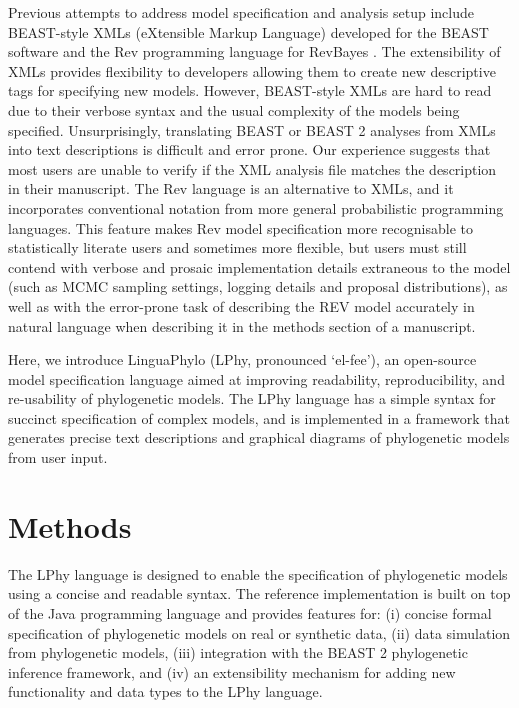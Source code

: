 \documentclass[10pt,letterpaper,table]{article}
\begin{document}
Previous attempts to address model specification and analysis setup include BEAST-style XMLs (eXtensible Markup Language) developed for the BEAST software \cite{beast,beast2} and the Rev programming language for RevBayes \cite{revbayes}. 
The extensibility of XMLs provides flexibility to developers allowing them to create new descriptive tags for specifying new models.
However, BEAST-style XMLs are hard to read due to their verbose syntax and the usual complexity of the models being specified. 
Unsurprisingly, translating BEAST or BEAST 2 analyses from XMLs into text descriptions is difficult and error prone. Our experience suggests that most users are unable to verify if the XML analysis file matches the description in their manuscript.
The Rev language \cite{revbayes} is an alternative to XMLs, and it incorporates conventional notation from more general probabilistic programming languages. 
This feature makes Rev model specification more recognisable to statistically literate users and sometimes more flexible, but users must still contend with verbose and prosaic implementation 
details extraneous to the model
(such as MCMC sampling settings, logging details and proposal distributions), as well as with the error-prone task of describing the REV model accurately in natural language when describing it in the methods section of a manuscript.
 
Here, we introduce LinguaPhylo (LPhy, pronounced `el-fee'), an open-source model specification 
language aimed at improving readability, reproducibility, and re-usability of phylogenetic models. 
The LPhy language has a simple syntax for succinct specification of complex models, and is implemented in a framework that generates precise text descriptions and graphical diagrams of phylogenetic models from user input.

\section{Methods}
The LPhy language is designed to enable the specification of phylogenetic models using a concise and readable syntax.  
The reference implementation is built on top of the Java programming language and provides features for: 
(i) concise formal specification of phylogenetic models on real or synthetic data, (ii) data simulation from phylogenetic models, (iii) integration with the BEAST 2 phylogenetic inference framework, and (iv) an extensibility mechanism for adding new functionality and data types to the LPhy language.
\end{document}
